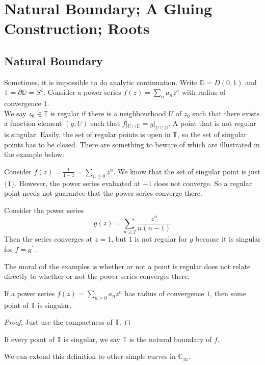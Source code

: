 \section{Natural Boundary; A Gluing Construction; Roots}
\subsection{Natural Boundary}
Sometimes, it is impossible to do analytic continuation.
Write $\mathbb D=D(0,1)$ and $\mathbb T=\partial\mathbb D=S^1$.
Consider a power series $f(z)=\sum_na_nz^n$ with radius of convergence $1$.\\
We say $z_0\in\mathbb T$ is regular if there is a neighbourhood $U$ of $z_0$ such that there exists a function element $(g,U)$ such that $f|_{U\cap\mathbb D}=g|_{U\cap\mathbb D}$.
A point that is not regular is singular.
Easily, the set of regular points is open in $\mathbb T$, so the set of singular points has to be closed.
There are something to beware of which are illustrated in the example below.
\begin{example}
    Consider $f(z)=\frac{1}{1-z}=\sum_{n\ge 0}z^n$.
    We know that the set of singular point is just $\{1\}$.
    However, the power series evaluated at $-1$ does not converge.
    So a regular point needs not guarantee that the power series converge there.
\end{example}
\begin{example}
    Consider the power series
    $$g(z)=\sum_{n\ge 2}\frac{z^n}{n(n-1)}$$
    Then the series converges at $z=1$, but $1$ is not regular for $g$ because it is singular for $f=g^{\prime\prime}$.
\end{example}
The moral od the examples is whether or not a point is regular does not relate directly to whether or not the power series converges there.
\begin{proposition}
    If a power series $f(z)=\sum_{n\ge 0}a_nz^n$ has radius of convergence $1$, then some point of $\mathbb T$ is singular.
\end{proposition}
\begin{proof}
    Just use the compactness of $\mathbb T$.
\end{proof}
\begin{definition}
    If every point of $\mathbb T$ is singular, we say $\mathbb T$ is the natural boundary of $f$.
\end{definition}
\begin{remark}
    We can extend this definition to other simple curves in $\mathbb C_\infty$.
\end{remark}
